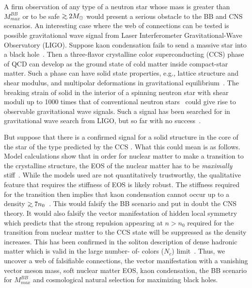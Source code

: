 \documentclass[aps,twocolumn,preprintnumbers,%
superscriptaddress,floatfix]{revtex4}
\begin{document}
A firm observation of any type of a neutron star whose mass is
greater than $M_{max}^{BB}$ or to be safe $\gsim 2\msun$ would
present a serious obstacle to the BB and CNS scenarios. An
interesting case where the web of connections can be tested is
possible gravitational wave signal from Laser Interferometer Gravitational-Wave Observatory (LIGO). Suppose kaon
condensation fails to send a massive star into a black
hole~\cite{footnote2}. Then a three-flavor crystalline color
superconducting (CCS) phase of QCD can develop as the ground state
of cold matter inside compact-star matter. Such a phase can have
solid state properties, e.g., lattice structure and shear modulus,
and multipolar deformations in gravitational
equilibrium~\cite{ippolitoetal}.  The breaking strain of solid in
the interior of a spinning neutron star with shear moduli up to 1000
times that of conventional neutron stars~\cite{mannarellietal07}
could give rise to observable gravitational wave signals. Such a
signal has been searched for in gravitational wave search from  LIGO,
but so far with no success~\cite{haskelletal}.

But suppose that there is a confirmed signal for a solid structure in the core of the star of the type predicted by the CCS . What this could mean is as follows. Model calculations show that in order for nuclear matter to make a transition to the crystalline structure,  the EOS of the nuclear matter has to be {\em maximally} stiff~\cite{ippolitoetal}. While the models used are not quantitatively trustworthy, the qualitative feature that requires the stiffness of EOS is likely robust. The stiffness required for the transition then implies that kaon condensation cannot occur up to  a density  $\gsim 7n_0$~\cite{pandha}. This would  falsify the BB scenario and put in doubt the CNS theory.  It would also falsify the vector manifestation of hidden local symmetry which predicts that the strong repulsion appearing at $n > n_0$ required for the transition from nuclear matter to the CCS state will be suppressed as the density increases. This has been confirmed in the soliton description of dense hadronic matter which is valid in the large number- of- colors ($N_c$) limit~\cite{PRV}.
Thus, we uncover a web of falsifiable connections, the vector manifestation with a vanishing vector meson mass, soft nuclear matter EOS, kaon condensation, the BB scenario for $M_{max}^{BB}$ and cosmological natural selection for maximizing black holes.
\end{document}
